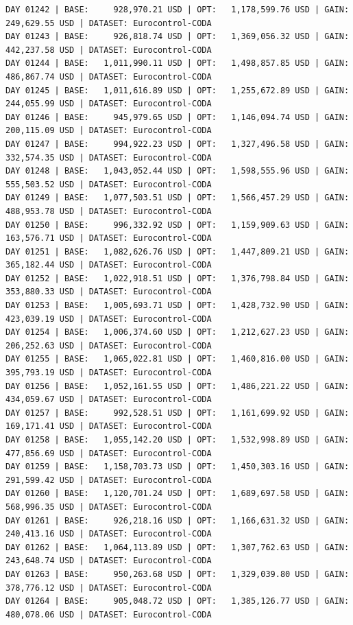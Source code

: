 \documentclass[11pt,a4paper]{article}
\begin{document}
\begin{verbatim}
DAY 01242 | BASE:     928,970.21 USD | OPT:   1,178,599.76 USD | GAIN: 249,629.55 USD | DATASET: Eurocontrol-CODA
DAY 01243 | BASE:     926,818.74 USD | OPT:   1,369,056.32 USD | GAIN: 442,237.58 USD | DATASET: Eurocontrol-CODA
DAY 01244 | BASE:   1,011,990.11 USD | OPT:   1,498,857.85 USD | GAIN: 486,867.74 USD | DATASET: Eurocontrol-CODA
DAY 01245 | BASE:   1,011,616.89 USD | OPT:   1,255,672.89 USD | GAIN: 244,055.99 USD | DATASET: Eurocontrol-CODA
DAY 01246 | BASE:     945,979.65 USD | OPT:   1,146,094.74 USD | GAIN: 200,115.09 USD | DATASET: Eurocontrol-CODA
DAY 01247 | BASE:     994,922.23 USD | OPT:   1,327,496.58 USD | GAIN: 332,574.35 USD | DATASET: Eurocontrol-CODA
DAY 01248 | BASE:   1,043,052.44 USD | OPT:   1,598,555.96 USD | GAIN: 555,503.52 USD | DATASET: Eurocontrol-CODA
DAY 01249 | BASE:   1,077,503.51 USD | OPT:   1,566,457.29 USD | GAIN: 488,953.78 USD | DATASET: Eurocontrol-CODA
DAY 01250 | BASE:     996,332.92 USD | OPT:   1,159,909.63 USD | GAIN: 163,576.71 USD | DATASET: Eurocontrol-CODA
DAY 01251 | BASE:   1,082,626.76 USD | OPT:   1,447,809.21 USD | GAIN: 365,182.44 USD | DATASET: Eurocontrol-CODA
DAY 01252 | BASE:   1,022,918.51 USD | OPT:   1,376,798.84 USD | GAIN: 353,880.33 USD | DATASET: Eurocontrol-CODA
DAY 01253 | BASE:   1,005,693.71 USD | OPT:   1,428,732.90 USD | GAIN: 423,039.19 USD | DATASET: Eurocontrol-CODA
DAY 01254 | BASE:   1,006,374.60 USD | OPT:   1,212,627.23 USD | GAIN: 206,252.63 USD | DATASET: Eurocontrol-CODA
DAY 01255 | BASE:   1,065,022.81 USD | OPT:   1,460,816.00 USD | GAIN: 395,793.19 USD | DATASET: Eurocontrol-CODA
DAY 01256 | BASE:   1,052,161.55 USD | OPT:   1,486,221.22 USD | GAIN: 434,059.67 USD | DATASET: Eurocontrol-CODA
DAY 01257 | BASE:     992,528.51 USD | OPT:   1,161,699.92 USD | GAIN: 169,171.41 USD | DATASET: Eurocontrol-CODA
DAY 01258 | BASE:   1,055,142.20 USD | OPT:   1,532,998.89 USD | GAIN: 477,856.69 USD | DATASET: Eurocontrol-CODA
DAY 01259 | BASE:   1,158,703.73 USD | OPT:   1,450,303.16 USD | GAIN: 291,599.42 USD | DATASET: Eurocontrol-CODA
DAY 01260 | BASE:   1,120,701.24 USD | OPT:   1,689,697.58 USD | GAIN: 568,996.35 USD | DATASET: Eurocontrol-CODA
DAY 01261 | BASE:     926,218.16 USD | OPT:   1,166,631.32 USD | GAIN: 240,413.16 USD | DATASET: Eurocontrol-CODA
DAY 01262 | BASE:   1,064,113.89 USD | OPT:   1,307,762.63 USD | GAIN: 243,648.74 USD | DATASET: Eurocontrol-CODA
DAY 01263 | BASE:     950,263.68 USD | OPT:   1,329,039.80 USD | GAIN: 378,776.12 USD | DATASET: Eurocontrol-CODA
DAY 01264 | BASE:     905,048.72 USD | OPT:   1,385,126.77 USD | GAIN: 480,078.06 USD | DATASET: Eurocontrol-CODA

\end{verbatim}
\end{document}
